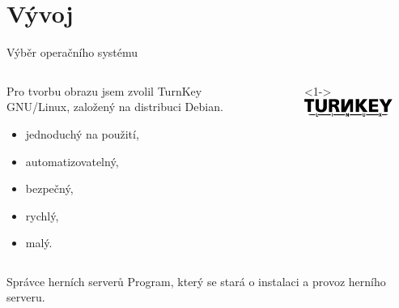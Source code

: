 \documentclass[czech,aspectratio=169]{beamer}
\begin{document}
  \section{Vývoj}
  \begin{frame}{Výběr operačního systému}
    \begin{columns}
      \begin{column}{.6\textwidth}
        Pro tvorbu obrazu jsem zvolil TurnKey GNU/Linux, založený na distribuci Debian.
        \begin{itemize}
          \item<2-> jednoduchý na použití,
          \item<3-> automatizovatelný,
          \item<4-> bezpečný,
          \item<5-> rychlý,
          \item<6-> malý.
        \end{itemize}
      \end{column}
      \begin{column}{.3\textwidth}
        \begin{itemize}
          \item[]<1->{\includegraphics[width=0.8\textwidth]{turnkey}}
        \end{itemize}
      \end{column}
    \end{columns}
  \end{frame}

  \begin{frame}{Správce herních serverů}
    Program, který se stará o instalaci a provoz herního serveru.
  \end{frame}
\end{document}
